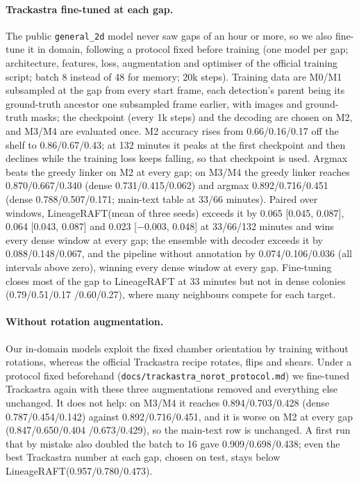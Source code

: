 \documentclass[10pt,twocolumn,letterpaper]{article}
\newcommand{\ours}{LineageRAFT\xspace}
\begin{document}
\paragraph{Trackastra fine-tuned at each gap.}
The public \texttt{general\_2d} model never saw gaps of an hour or more, so we also fine-tune it in domain, following a protocol fixed before training (one model per gap; architecture, features, loss, augmentation and optimiser of the official training script; batch 8 instead of 48 for memory; 20k steps).
Training data are M0/M1 subsampled at the gap from every start frame, each detection's parent being its ground-truth ancestor one subsampled frame earlier, with images and ground-truth masks; the checkpoint (every 1k steps) and the decoding are chosen on M2, and M3/M4 are evaluated once.
M2 accuracy rises from 0.66/0.16/0.17 off the shelf to 0.86/0.67/0.43; at 132 minutes it peaks at the first checkpoint and then declines while the training loss keeps falling, so that checkpoint is used.
Argmax beats the greedy linker on M2 at every gap; on M3/M4 the greedy linker reaches 0.870/0.667/0.340 (dense 0.731/0.415/0.062) and argmax 0.892/0.716/0.451 (dense 0.788/0.507/0.171; main-text table at 33/66 minutes).
Paired over windows, \ours (mean of three seeds) exceeds it by 0.065 [0.045, 0.087], 0.064 [0.043, 0.087] and 0.023 [$-$0.003, 0.048] at 33/66/132 minutes and wins every dense window at every gap; the ensemble with decoder exceeds it by 0.088/0.148/0.067, and the pipeline without annotation by 0.074/0.106/0.036 (all intervals above zero), winning every dense window at every gap.
Fine-tuning closes most of the gap to \ours at 33 minutes but not in dense colonies (0.79/0.51/0.17 /0.60/0.27), where many neighbours compete for each target.

\paragraph{Without rotation augmentation.}
Our in-domain models exploit the fixed chamber orientation by training without rotations, whereas the official Trackastra recipe rotates, flips and shears. Under a protocol fixed beforehand (\texttt{docs/trackastra\_norot\_protocol.md}) we fine-tuned Trackastra again with these three augmentations removed and everything else unchanged. It does not help: on M3/M4 it reaches 0.894/0.703/0.428 (dense 0.787/0.454/0.142) against 0.892/0.716/0.451, and it is worse on M2 at every gap (0.847/0.650/0.404 /0.673/0.429), so the main-text row is unchanged. A first run that by mistake also doubled the batch to 16 gave 0.909/0.698/0.438; even the best Trackastra number at each gap, chosen on test, stays below \ours (0.957/0.780/0.473).
\end{document}
